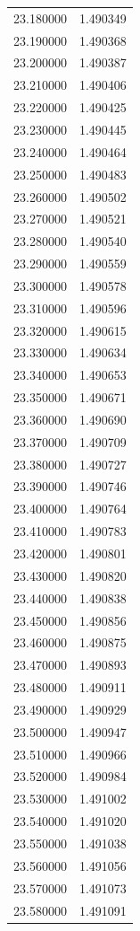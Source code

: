 \begin{tabular}{rr}
23.180000 & 1.490349 \\
23.190000 & 1.490368 \\
23.200000 & 1.490387 \\
23.210000 & 1.490406 \\
23.220000 & 1.490425 \\
23.230000 & 1.490445 \\
23.240000 & 1.490464 \\
23.250000 & 1.490483 \\
23.260000 & 1.490502 \\
23.270000 & 1.490521 \\
23.280000 & 1.490540 \\
23.290000 & 1.490559 \\
23.300000 & 1.490578 \\
23.310000 & 1.490596 \\
23.320000 & 1.490615 \\
23.330000 & 1.490634 \\
23.340000 & 1.490653 \\
23.350000 & 1.490671 \\
23.360000 & 1.490690 \\
23.370000 & 1.490709 \\
23.380000 & 1.490727 \\
23.390000 & 1.490746 \\
23.400000 & 1.490764 \\
23.410000 & 1.490783 \\
23.420000 & 1.490801 \\
23.430000 & 1.490820 \\
23.440000 & 1.490838 \\
23.450000 & 1.490856 \\
23.460000 & 1.490875 \\
23.470000 & 1.490893 \\
23.480000 & 1.490911 \\
23.490000 & 1.490929 \\
23.500000 & 1.490947 \\
23.510000 & 1.490966 \\
23.520000 & 1.490984 \\
23.530000 & 1.491002 \\
23.540000 & 1.491020 \\
23.550000 & 1.491038 \\
23.560000 & 1.491056 \\
23.570000 & 1.491073 \\
23.580000 & 1.491091 \\

\end{tabular}
